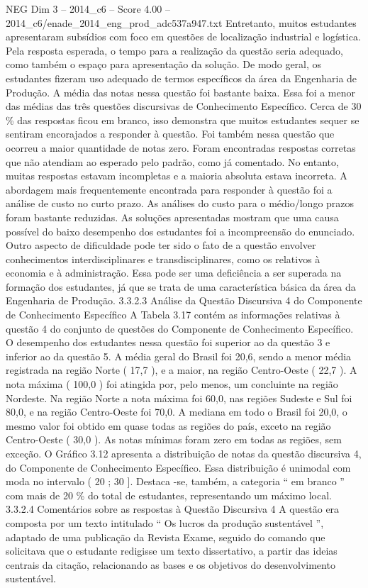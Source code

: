 \begin{textsample}{NEG Dim 3 – 2014\_c6 – Score 4.00 – 2014\_c6/enade\_2014\_eng\_prod\_adc537a947.txt}
Entretanto, muitos estudantes apresentaram subsídios com foco em questões de localização industrial e logística.
Pela resposta esperada, o tempo para a realização da questão seria adequado, como também o espaço para apresentação da solução.
De modo geral, os estudantes fizeram uso adequado de termos específicos da área da Engenharia de Produção.
A média das notas nessa questão foi bastante baixa.
Essa foi a menor das médias das três questões discursivas de Conhecimento Específico.
Cerca de 30 \% das respostas ficou em branco, isso demonstra que muitos estudantes sequer se sentiram encorajados a responder à questão.
Foi também nessa questão que ocorreu a maior quantidade de notas zero.
Foram encontradas respostas corretas que não atendiam ao esperado pelo padrão, como já comentado.
No entanto, muitas respostas estavam incompletas e a maioria absoluta estava incorreta.
A abordagem mais frequentemente encontrada para responder à questão foi a análise de custo no curto prazo.
As análises do custo para o médio/longo prazos foram bastante reduzidas.
As soluções apresentadas mostram que uma causa possível do baixo desempenho dos estudantes foi a incompreensão do enunciado.
Outro aspecto de dificuldade pode ter sido o fato de a questão envolver conhecimentos interdisciplinares e transdisciplinares, como os relativos à economia e à administração.
Essa pode ser uma deficiência a ser superada na formação dos estudantes, já que se trata de uma característica básica da área da Engenharia de Produção. 3.3.2.3 Análise da Questão Discursiva 4 do Componente de Conhecimento Específico A Tabela 3.17 contém as informações relativas à questão 4 do conjunto de questões do Componente de Conhecimento Específico.
O desempenho dos estudantes nessa questão foi superior ao da questão 3 e inferior ao da questão 5.
A média geral do Brasil foi 20,6, sendo a menor média registrada na região Norte ( 17,7 ), e a maior, na região Centro-Oeste ( 22,7 ).
A nota máxima ( 100,0 ) foi atingida por, pelo menos, um concluinte na região Nordeste.
Na região Norte a nota máxima foi 60,0, nas regiões Sudeste e Sul foi 80,0, e na região Centro-Oeste foi 70,0.
A mediana em todo o Brasil foi 20,0, o mesmo valor foi obtido em quase todas as regiões do país, exceto na região Centro-Oeste ( 30,0 ).
As notas mínimas foram zero em todas as regiões, sem exceção.
O Gráfico 3.12 apresenta a distribuição de notas da questão discursiva 4, do Componente de Conhecimento Específico.
Essa distribuição é unimodal com moda no intervalo ( 20 ; 30 ].
Destaca -se, também, a categoria “ em branco ” com mais de 20 \% do total de estudantes, representando um máximo local. 3.3.2.4 Comentários sobre as respostas à Questão Discursiva 4 A questão era composta por um texto intitulado “ Os lucros da produção sustentável ”, adaptado de uma publicação da Revista Exame, seguido do comando que solicitava que o estudante redigisse um texto dissertativo, a partir das ideias centrais da citação, relacionando as bases e os objetivos do desenvolvimento sustentável.

\end{textsample}
